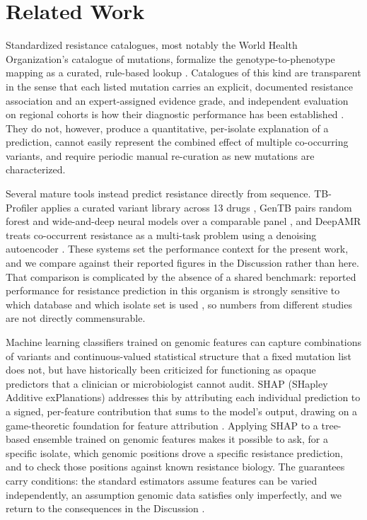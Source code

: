 \section{Related Work}

Standardized resistance catalogues, most notably the World Health Organization's catalogue of mutations, formalize the genotype-to-phenotype mapping as a curated, rule-based lookup \cite{who2023catalogue}. Catalogues of this kind are transparent in the sense that each listed mutation carries an explicit, documented resistance association and an expert-assigned evidence grade, and independent evaluation on regional cohorts is how their diagnostic performance has been established \cite{garciamarin2024role}. They do not, however, produce a quantitative, per-isolate explanation of a prediction, cannot easily represent the combined effect of multiple co-occurring variants, and require periodic manual re-curation as new mutations are characterized.

Several mature tools instead predict resistance directly from sequence. TB-Profiler applies a curated variant library across 13 drugs \cite{phelan2019tbprofiler}, GenTB pairs random forest and wide-and-deep neural models over a comparable panel \cite{groschel2021gentb}, and DeepAMR treats co-occurrent resistance as a multi-task problem using a denoising autoencoder \cite{yang2019deepamr}. These systems set the performance context for the present work, and we compare against their reported figures in the Discussion rather than here. That comparison is complicated by the absence of a shared benchmark: reported performance for resistance prediction in this organism is strongly sensitive to which database and which isolate set is used \cite{ngo2019benchmarking}, so numbers from different studies are not directly commensurable.

Machine learning classifiers trained on genomic features can capture combinations of variants and continuous-valued statistical structure that a fixed mutation list does not, but have historically been criticized for functioning as opaque predictors that a clinician or microbiologist cannot audit. SHAP (SHapley Additive exPlanations) addresses this by attributing each individual prediction to a signed, per-feature contribution that sums to the model's output, drawing on a game-theoretic foundation for feature attribution \cite{lundberg2017unified}. Applying SHAP to a tree-based ensemble trained on genomic features makes it possible to ask, for a specific isolate, which genomic positions drove a specific resistance prediction, and to check those positions against known resistance biology. The guarantees carry conditions: the standard estimators assume features can be varied independently, an assumption genomic data satisfies only imperfectly, and we return to the consequences in the Discussion \cite{aas2021explaining,kumar2020problems}.

